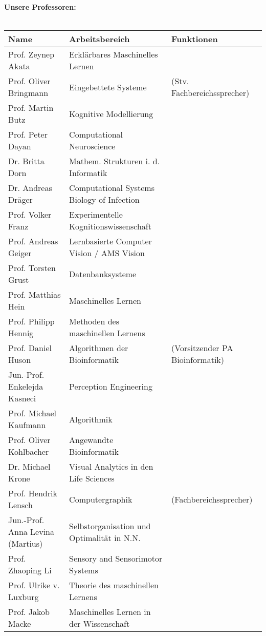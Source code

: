 \renewcommand{\arraystretch}{1}
\scriptsize
\textbf{Unsere Professoren:}\\\\
\begin{tabular}{|lll|}
\hline
Name                          & Arbeitsbereich & Funktionen \\
\hline
\hline
Prof. Zeynep Akata            & Erklärbares Maschinelles Lernen &\\
Prof. Oliver Bringmann        & Eingebettete Systeme & (Stv. Fachbereichssprecher)\\
Prof. Martin Butz             & Kognitive Modellierung 	&	\\
Prof. Peter Dayan             & Computational Neuroscience &\\
Dr. Britta Dorn               & Mathem. Strukturen i. d. Informatik &\\
Dr. Andreas Dräger			  & Computational Systems Biology of Infection &\\
Prof. Volker Franz			  & Experimentelle Kognitionswissenschaft &\\ 
Prof. Andreas Geiger          &  Lernbasierte Computer Vision / AMS Vision &\\
Prof. Torsten Grust	          & Datenbanksysteme			& \\
Prof. Matthias Hein  		  & Maschinelles Lernen & \\
Prof. Philipp Hennig		  & Methoden des maschinellen Lernens & \\
Prof. Daniel Huson            & Algorithmen der Bioinformatik & (Vorsitzender PA Bioinformatik) \\
Jun.-Prof. Enkelejda Kasneci		  & Perception Engineering &\\
Prof. Michael Kaufmann        & Algorithmik		&	\\
Prof. Oliver Kohlbacher       & Angewandte Bioinformatik &\\
Dr. Michael Krone 			  & Visual Analytics in den Life Sciences & \\
Prof. Hendrik Lensch          & Computergraphik	& (Fachbereichssprecher)\\
Jun.-Prof. Anna Levina (Martius) & Selbstorganisation und Optimalität in N.N. & \\
Prof. Zhaoping Li			  & Sensory and Sensorimotor Systems &\\
Prof. Ulrike v. Luxburg		  & Theorie des maschinellen Lernens & \\
Prof. Jakob Macke             & Maschinelles Lernen in der Wissenschaft &\\

\end{tabular}
